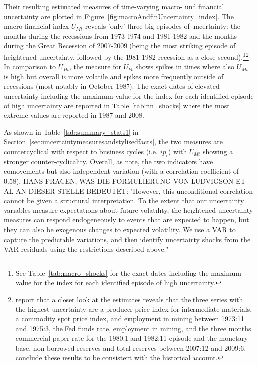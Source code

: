 \documentclass[a4paper,11pt,listof=nochaptergap,oneside,pointednumbers,bibtotoc,bigheadings,liststotoc,hidelinks]{scrbook}
\theoremstyle{mysatz}
\theoremstyle{mydefinition}
\theoremstyle{mytheorem}
\theoremstyle{mybemerkung}
\begin{document}
Their resulting estimated measures of time-varying macro- und financial uncertainty are plotted in Figure~\ref{fig:macroAndfinUncertainty_index}. The macro financial index $U_{Mt}$ reveals 'only' three big episodes of uncertainty: the months during the recessions from 1973-1974 and 1981-1982 and the months during the Great Recession of 2007-2009 (being the most striking episode of heightened uncertainty, followed by the 1981-1982 recession as a close second).\footnote{See Table~\ref{tab:macro_shocks} for the exact dates including the maximum value for the index for each identified episode of high uncertainty.}\footnote{\citet{juradoetal:15} report that a closer look at the estimates reveals that the three series with the highest uncertainty are a producer price index for intermediate materials, a commodity spot price index, and employment in mining between 1973:11 and 1975:3, the Fed funds rate, employment in mining, and the three months commercial paper rate for the 1980:1 and 1982:11 episode and the monetary base, non-borrowed reserves and total reserves between 2007:12 and 2009:6. \citet{juradoetal:15} conclude these results to be consistent with the historical account.} In comparison to $U_{Mt}$, the measure for $U_{Ft}$ shows spikes in times where also $U_{Mt}$ is high but overall is more volatile and spikes more frequently outside of recessions (most notably in October 1987). The exact dates of elevated uncertainty including the maximum value for the index for each identified episode of high uncertainty are reported in Table~\ref{tab:fin_shocks} where the most extreme values are reported in 1987 and 2008.

As shown in Table~\ref{tab:summary_stats1} in Section~\ref{sec:uncertaintymeasuresandstylizedfacts}, the two measures are countercyclical with respect to business cycles (i.e. $ip_t$) with $U_{Mt}$ showing a stronger counter-cyclicality. Overall, as \citet{ludvigsonetal:18} note, the two indicators have comovements but also independent variation (with a correlation coefficient of 0.58). HANS FRAGEN, WAS DIE FORMULIERUNG VON LUDVIGSON ET AL AN DIESER STELLE BEDEUTET: "However, this unconditional correlation cannot be given a structural interpretation. To the extent that our uncertainty variables measure expectations about future volatility, the heightened uncertainty measures can respond endogeneously to events that are expected to happen, but they can also be exogenous changes to expected volatility. We use a VAR to capture the predictable variations, and then identify uncertainty shocks from the VAR residuals using the restrictions described above."
\end{document}
